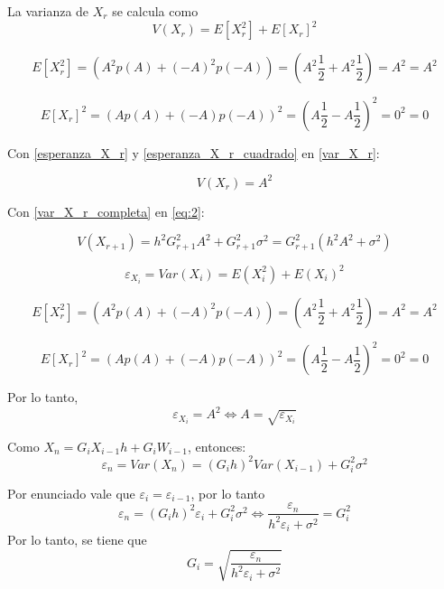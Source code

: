 \documentclass{article}
\begin{document}
La varianza de $X_r$ se calcula como
\begin{equation}\label{var_X_r}
    V(X_r)=E[X_r^2]+E[X_r]^2
\end{equation}

\begin{equation}\label{esperanza_X_r_cuadrado}
    E[X_r^2]=(A^2 p(A)+(-A)^2p(-A))=(A^2\frac{1}{2}+A^2\frac{1}{2})=A^2=A^2
\end{equation}

\begin{equation}\label{esperanza_X_r}
    E[X_r]^2=(Ap(A)+(-A)p(-A))^2=(A\frac{1}{2}-A\frac{1}{2})^2=0^2=0
\end{equation}

Con \ref{esperanza_X_r} y \ref{esperanza_X_r_cuadrado} en \ref{var_X_r}:

\begin{equation}\label{var_X_r_completa}
    V(X_r)=A^2
\end{equation}

Con \ref{var_X_r_completa} en \ref{eq:2}:

\begin{equation}
    V(X_{r+1})=h^2 G_{r+1}^2 A^2 + G_{r+1} ^2 \sigma ^2 = G_{r+1}^2(h^2 A^2 + \sigma ^2)
\end{equation}
\fi

\begin{equation}
    \varepsilon_{X_i}=Var(X_i)=E(X_i^2)+E(X_i)^2
\end{equation}

\begin{equation}\label{esperanza_X_r_cuadrado}
    E[X_r^2]=(A^2 p(A)+(-A)^2p(-A))=(A^2\frac{1}{2}+A^2\frac{1}{2})=A^2=A^2
\end{equation}

\begin{equation}\label{esperanza_X_r}
    E[X_r]^2=(Ap(A)+(-A)p(-A))^2=(A\frac{1}{2}-A\frac{1}{2})^2=0^2=0
\end{equation}

Por lo tanto, 
\begin{equation}
    \varepsilon_{X_i}=A^2 \Leftrightarrow A=\sqrt{\varepsilon_{X_i}}
\end{equation}

Como $X_n = G_i X_{i-1} h + G_i W_{i-1}$, entonces:
\begin{equation}
    \varepsilon_n=Var(X_n)=(G_i h)^2 Var(X_{i-1})+G_i^2 \sigma ^2
\end{equation}

Por enunciado vale que $\varepsilon_i = \varepsilon_{i-1}$, por lo tanto
\begin{equation}
    \varepsilon_n = (G_i h)^2 \varepsilon_i + G_i^2 \sigma ^2 \Leftrightarrow \frac{\varepsilon_n}{h^2 \varepsilon_i + \sigma ^2}=G_i^2
\end{equation}
Por lo tanto, se tiene que 
\begin{equation}
    G_i=\sqrt{\frac{\varepsilon_n}{h^2 \varepsilon_i + \sigma ^2}}
\end{equation}
\end{document}
